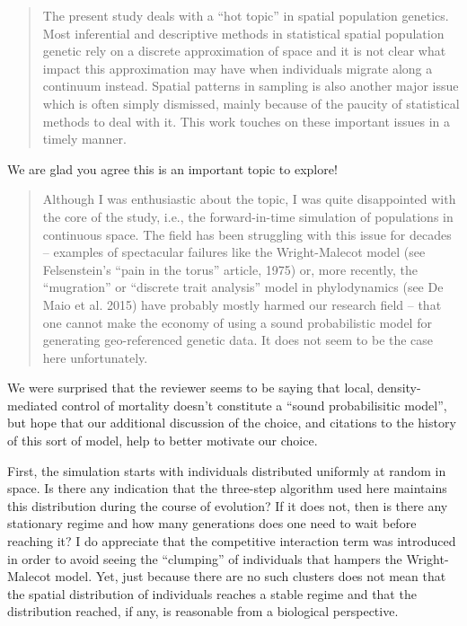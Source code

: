 


\begin{quote}
    The present study deals with a ``hot topic'' in spatial population genetics. Most
    inferential and descriptive methods in statistical spatial population
    genetic rely on a discrete approximation of space and it is not clear what
    impact this approximation may have when individuals migrate along a
    continuum instead. Spatial patterns in sampling is also another major issue
    which is often simply dismissed, mainly because of the paucity of
    statistical methods to deal with it. This work touches on these important
    issues in a timely manner.
\end{quote}

We are glad you agree this is an important topic to explore!

\begin{quote}
    Although I was enthusiastic about the topic, I was quite disappointed with
    the core of the study, i.e., the forward-in-time simulation of populations in
    continuous space. The field has been struggling with this issue for decades --
    examples of spectacular failures like the Wright-Malecot model (see
    Felsenstein's ``pain in the torus'' article, 1975) or, more recently, the
    ``mugration'' or ``discrete trait analysis'' model in phylodynamics (see De Maio
    et al. 2015) have probably mostly harmed our research field -- that one cannot
    make the economy of using a sound probabilistic model for generating
    geo-referenced genetic data. It does not seem to be the case here
    unfortunately.  
\end{quote}

We were surprised that the reviewer seems to be saying that local, density-mediated control of mortality
doesn't constitute a ``sound probabilisitic model'',
but hope that our additional discussion of the choice,
and citations to the history of this sort of model,
help to better motivate our choice.

\begin{point}{}
    First, the simulation starts with individuals distributed uniformly at random in space. Is there any indication that the three-step algorithm used here maintains this distribution during the course of evolution? If it does not, then is there any stationary regime and how many generations does one need to wait before reaching it? I do appreciate that the competitive interaction term was introduced in order to avoid seeing the ``clumping'' of individuals that hampers the Wright-Malecot model. Yet, just because there are no such clusters does not mean that the spatial distribution of individuals reaches a stable regime and that the distribution reached, if any, is reasonable from a biological perspective.
\end{point}


